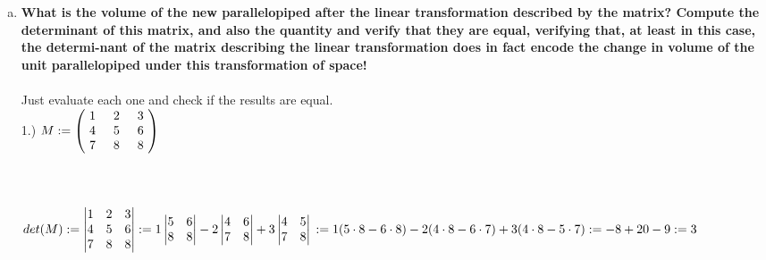 \documentclass{article}
\begin{document}
\begin{enumerate}[c.]
\item\textbf{What is the volume of the new parallelopiped after
the linear transformation described by the matrix? Compute the determinant
of this matrix, and also the quantity and verify that they are equal, verifying that, at least in this case, the determi-nant of the matrix describing the linear transformation does in fact encode the change in volume of the unit parallelopiped under this transformation of space!}\\
\\
Just evaluate each one and check if the results are equal.\\
1.)
  $M:=\left(\!
    \begin{array}{c}
      1 \hspace{.5cm} 2 \hspace{.5cm} 3 \\
      4 \hspace{.5cm} 5 \hspace{.5cm} 6 \\
      7 \hspace{.5cm} 8 \hspace{.5cm} 8 \\
    \end{array}
  \!\right)$\\
  \\  
  \\
  \\
  $det(M ) := \begin{vmatrix}
1&2&3\\
4&5&6\\
7&8&8\\
\end{vmatrix}:=1\begin{vmatrix}
5&6\\
8&8\\
\end{vmatrix}-2\begin{vmatrix}
4&6\\
7&8\\
\end{vmatrix}+3\begin{vmatrix}
4&5\\
7&8\\
\end{vmatrix}\\:=1(5\cdot8-6\cdot8)-2(4\cdot8-6\cdot7)+3(4\cdot8-5\cdot7)\\:=-8+20-9:=3$\\

\end{enumerate}
\end{document}
